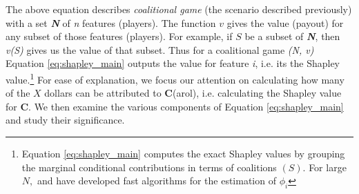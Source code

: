 The above equation describes \emph{coalitional game} (the scenario described previously) with a set \textbf{\emph{N}} of \emph{n} features (players). The function $v$ gives the value (payout) for any subset of those features (players). For example, if $S$ be a subset of \textbf{\emph{N}}, then \emph{v(S)} gives us the value of that subset. Thus for a coalitional game \emph{(N, v)} Equation \ref{eq:shapley_main} outputs the value for feature \emph{i}, i.e. its the Shapley value.\footnote{Equation \ref{eq:shapley_main} computes the exact Shapley values by grouping the marginal conditional contributions in terms of coalitions $(S)$. For large $N,$ \cite{shap1} and \cite{shap2} have developed fast algorithms for the estimation of $\phi_{i}$} For ease of explanation, we focus our attention on calculating how many of the $X$ dollars can be attributed to \textbf{C}(arol), i.e. calculating the Shapley value for \textbf{C}. We then examine the various components of Equation \ref{eq:shapley_main} and study their significance.
